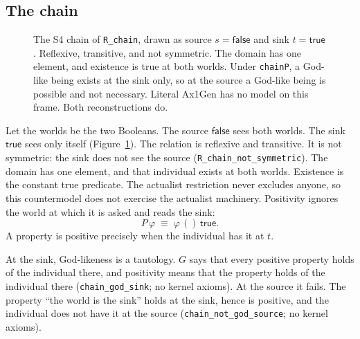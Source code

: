 \documentclass[11pt,a4paper]{article}
\newcommand{\lean}[1]{\texttt{#1}}
\theoremstyle{definition}
\theoremstyle{remark}
\begin{document}
\subsection{The chain}

\begin{figure}[t]
\centering
{}
\caption{The S4 chain of \lean{R\_chain}, drawn as source \(s = \mathsf{false}\)
and sink \(t = \mathsf{true}\).
Reflexive, transitive, and not symmetric.
The domain has one element, and existence is true at both worlds.
Under \lean{chainP}, a God-like being exists at the sink only, so at the
source a God-like being is possible and not necessary.
Literal Ax1Gen has no model on this frame.
Both reconstructions do.}
\label{fig:chain}
\end{figure}

Let the worlds be the two Booleans.
The source \(\mathsf{false}\) sees both worlds.
The sink \(\mathsf{true}\) sees only itself
(Figure~\ref{fig:chain}).
The relation is reflexive and transitive.
It is not symmetric: the sink does not see the source
(\lean{R\_chain\_not\_symmetric}).
The domain has one element, and that individual exists at both worlds.
Existence is the constant true predicate.
The actualist restriction never excludes anyone, so this countermodel does
not exercise the actualist machinery.
Positivity ignores the world at which it is asked and reads the sink:
\[
  P\,\varphi \;\equiv\; \varphi\,()\,\mathsf{true}.
\]
A property is positive precisely when the individual has it at \(t\).

At the sink, God-likeness is a tautology.
\(G\) says that every positive property holds of the individual there, and
positivity means that the property holds of the individual there
(\lean{chain\_god\_sink}; no kernel axioms).
At the source it fails.
The property ``the world is the sink'' holds at the sink, hence is positive,
and the individual does not have it at the source
(\lean{chain\_not\_god\_source}; no kernel axioms).
\end{document}
